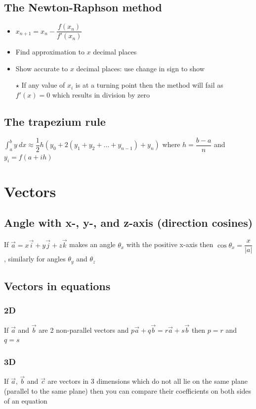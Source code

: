 \documentclass[A4paper]{article}
\begin{document}
	\subsection{The Newton-Raphson method}
	\begin{itemize}
		\item $x_{n+1}=x_n-\dfrac{f(x_n)}{f'(x_n)}$
		\item Find approximation to $x$ decimal places
		\item Show accurate to $x$ decimal places: use change in sign to show
		\item[$\star$] If any value of $x_i$ is at a turning point then the method will fail as $f'(x)=0$ which results in division by zero
	\end{itemize}
	
	\subsection{The trapezium rule}
	$\int_{a}^{b}y\:dx \approx \dfrac{1}{2} h (y_0+2(y_1+y_2+\dots+y_{n-1})+y_n)$ where $h=\dfrac{b-a}{n}$ and $y_i=f(a+ih)$


	\pagebreak

	\section{Vectors}
	\subsection{Angle with x-, y-, and z-axis (direction cosines)}
	If $\vec{a}=x\vec{i}+y\vec{j}+z\vec{k}$ makes an angle $\theta_x$ with the positive x-axis then $\cos \theta_x=\dfrac{x}{|a|}$, similarly for angles $\theta_y$ and $\theta_z$
	\subsection{Vectors in equations}
	\subsubsection{2D}
	If $\vec{a}$ and $\vec{b}$ are 2 non-parallel vectors and $p\vec{a}+q\vec{b}=r\vec{a}+s\vec{b}$ then $p=r$ and $q=s$
	\subsubsection{3D}
	If $\vec{a}$, $\vec{b}$ and $\vec{c}$ are vectors in 3 dimensions which do not all lie on the same plane (parallel to the same plane) then you can compare their coefficients on both sides of an equation
	
\end{document}
